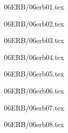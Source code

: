 \documentclass[9pt, xcolor={svgnames, x11names},professionalfonts]{beamer}
\def\scale{1}
\begin{document}

\begin{frame}{06ERB/06erb01.tex}	
	\def\scale{0.55}	
			
\end{frame}


\begin{frame}{06ERB/06erb02.tex}
		\def\scale{0.55}		
				
\end{frame}


\begin{frame}{06ERB/06erb03.tex}	
	\def\scale{0.55}	
		
\end{frame}


\begin{frame}{06ERB/06erb04.tex}
	\def\scale{0.75}
	
\end{frame}


\begin{frame}{06ERB/06erb05.tex}
	\def\scale{0.675}
	
\end{frame}


\begin{frame}{06ERB/06erb06.tex}	
		\def\scale{1}
		
\end{frame}


\begin{frame}{06ERB/06erb07.tex}	
		\def\scale{0.65}
		
\end{frame}


\begin{frame}{06ERB/06erb08.tex}	
		\def\scale{0.75}
		
\end{frame}
\end{document}

